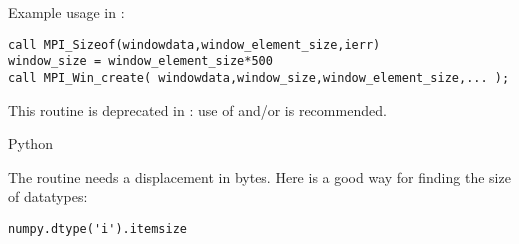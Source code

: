 Example usage in :
\begin{lstlisting}
call MPI_Sizeof(windowdata,window_element_size,ierr)
window_size = window_element_size*500
call MPI_Win_create( windowdata,window_size,window_element_size,... );
\end{lstlisting}
\lstset{language=C} %

This routine is deprecated in : use of
 and/or  is recommended.

 {Python}

The  routine needs a displacement in
bytes. Here is a good way for finding the size of  datatypes:
\lstset{style=reviewcode,language=Python} %
\begin{lstlisting}
numpy.dtype('i').itemsize
\end{lstlisting}
\lstset{language=C} %


